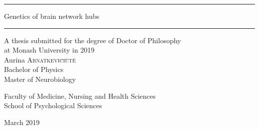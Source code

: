 \thispagestyle{empty}
\begin{center}

\begin{center}
\end{center}

\parbox{150mm}{\fontsize{20}{20}\bf\centering 

\noindent
{\color[RGB]{0, 77, 153} \rule{\linewidth}{0.5mm} }
\vspace{5mm}
Genetics of brain network hubs}
\vspace{5mm}
\noindent
{\color[RGB]{0, 77, 153} \rule{\linewidth}{0.5mm} }
              
              
\fontsize{16}{16}


{\Large A thesis submitted for the degree of Doctor of Philosophy} \\
{\Large at Monash University in 2019}\\


{\Large Aurina \textsc{Arnatkevi\u{c}i\={u}t\.{e}}}\\
Bachelor of Physics\\Master of Neurobiology

{\Large Faculty of Medicine, Nursing and Health Sciences}\\
{\Large School of Psychological Sciences}


{March 2019}

\end{center}

\clearpage \thispagestyle{empty} \cleardoublepage 
